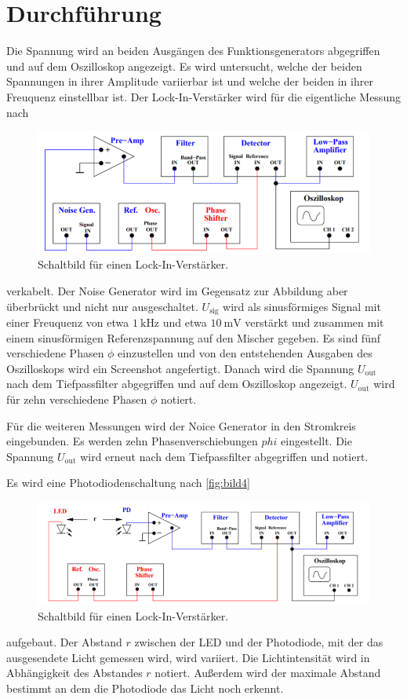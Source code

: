\section{Durchführung}
\label{sec:Durchführung}


Die Spannung wird an beiden Ausgängen des Funktionsgenerators abgegriffen und auf dem Oszilloskop angezeigt.
Es wird untersucht, welche der beiden Spannungen in ihrer Amplitude variierbar ist und welche der beiden in ihrer Freuquenz einstellbar ist.
Der Lock-In-Verstärker wird für die eigentliche Messung nach 

\begin{figure}
    \centering
    \includegraphics[width=\textwidth/2]{images/bild3.png}
    \caption{Schaltbild für einen Lock-In-Verstärker.\cite{V303}}
    \label{fig:bild3}
\end{figure}

verkabelt.
Der Noise Generator wird im Gegensatz zur Abbildung aber überbrückt und nicht nur ausgeschaltet.
$U_\text{sig}$ wird als sinusförmiges Signal mit einer Freuquenz von etwa $\SI{1}{\kilo\hertz}$ und etwa $\SI{10}{\milli\volt}$ verstärkt und zusammen mit einem sinusförmigen Referenzspannung auf den Mischer gegeben.
Es sind fünf verschiedene Phasen $\phi$ einzustellen und von den entstehenden Ausgaben des Oszilloskops wird ein Screenshot angefertigt.
Danach wird die Spannung $U_\text{out}$ nach dem Tiefpassfilter abgegriffen und auf dem Oszilloskop angezeigt.
$U_\text{out}$ wird für zehn verschiedene Phasen $\phi$ notiert.

Für die weiteren Messungen wird der Noice Generator in den Stromkreis eingebunden. 
Es werden zehn Phasenverschiebungen $phi$ eingestellt.
Die Spannung $U_\text{out}$ wird erneut nach dem Tiefpassfilter abgegriffen und notiert.


Es wird eine Photodiodenschaltung nach \autoref{fig:bild4} 

\begin{figure}
    \centering
    \includegraphics[width=\textwidth/2]{images/bild4.png}
    \caption{Schaltbild für einen Lock-In-Verstärker.\cite{V303}}
    \label{fig:bild4}
\end{figure}

aufgebaut.
Der Abstand $r$ zwischen der LED und der Photodiode, mit der das ausgesendete Licht gemessen wird, wird variiert.
Die Lichtintensität wird in Abhängigkeit des Abstandes $r$ notiert.
Außerdem wird der maximale Abstand bestimmt an dem die Photodiode das Licht noch erkennt.